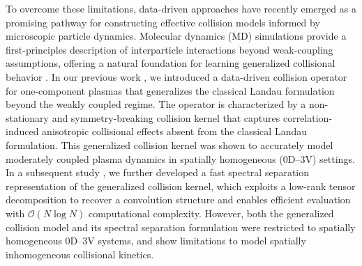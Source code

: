 \documentclass[preprint,1p,times]{elsarticle}
\theoremstyle{definition}
\theoremstyle{remark}
\begin{document}
To overcome these limitations, data-driven approaches have recently emerged as a promising pathway for constructing effective collision models informed by microscopic particle dynamics. 
Molecular dynamics (MD) simulations provide a first-principles description of interparticle interactions beyond weak-coupling assumptions, offering a natural foundation for learning generalized collisional behavior \cite{Stanton_Murillo_PRE_2016,baalrud2013effective}. 
In our previous work \cite{zhao2025data}, we introduced a data-driven collision operator for one-component plasmas that generalizes the classical Landau formulation beyond the weakly coupled regime. 
The operator is characterized by a non-stationary and symmetry-breaking collision kernel that captures correlation-induced anisotropic collisional effects absent from the classical Landau formulation. 
This generalized collision kernel was shown to accurately model moderately coupled plasma dynamics in spatially homogeneous (0D–3V) settings.
In a subsequent study \cite{zhao2025fast}, we further developed a fast spectral separation representation of the generalized collision kernel, which exploits a low-rank tensor decomposition to recover a convolution structure and enables efficient evaluation with $\mathcal{O}(N\log N)$ computational complexity.
However, both the generalized collision model and its spectral separation formulation were restricted to spatially homogeneous 0D–3V systems, and show limitations to model spatially inhomogeneous collisional kinetics.

\end{document}
